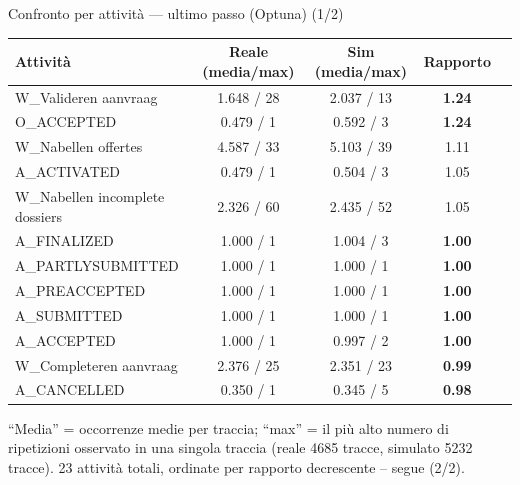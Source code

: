 \documentclass[11pt,aspectratio=169]{beamer}
\newcommand{\good}[1]{\textcolor{goodcol}{\textbf{#1}}}
\newcommand{\warncell}[1]{\textcolor{warncol}{\textbf{#1}}}
\begin{document}
\begin{frame}{Confronto per attivit\`a --- ultimo passo (Optuna) (1/2)}
\centering
\scriptsize
\begin{tabular}{lcccc}
\toprule
\textbf{Attivit\`a} & \textbf{Reale (media/max)} & \textbf{Sim (media/max)} & \textbf{Rapporto} \\
\midrule
W\_Valideren aanvraag & 1.648 / 28 & 2.037 / 13 & \warncell{1.24} \\
O\_ACCEPTED & 0.479 / 1 & 0.592 / 3 & \warncell{1.24} \\
W\_Nabellen offertes & 4.587 / 33 & 5.103 / 39 & 1.11 \\
A\_ACTIVATED & 0.479 / 1 & 0.504 / 3 & 1.05 \\
W\_Nabellen incomplete dossiers & 2.326 / 60 & 2.435 / 52 & 1.05 \\
A\_FINALIZED & 1.000 / 1 & 1.004 / 3 & \good{1.00} \\
A\_PARTLYSUBMITTED & 1.000 / 1 & 1.000 / 1 & \good{1.00} \\
A\_PREACCEPTED & 1.000 / 1 & 1.000 / 1 & \good{1.00} \\
A\_SUBMITTED & 1.000 / 1 & 1.000 / 1 & \good{1.00} \\
A\_ACCEPTED & 1.000 / 1 & 0.997 / 2 & \good{1.00} \\
W\_Completeren aanvraag & 2.376 / 25 & 2.351 / 23 & \good{0.99} \\
A\_CANCELLED & 0.350 / 1 & 0.345 / 5 & \good{0.98} \\
\bottomrule
\end{tabular}
\vspace{0.8em}

{\small ``Media'' = occorrenze medie per traccia; ``max'' = il pi\`u alto numero di ripetizioni osservato in una singola traccia (reale 4685 tracce, simulato 5232 tracce). 23 attivit\`a totali, ordinate per rapporto decrescente -- segue (2/2).}
\end{frame}
\end{document}
